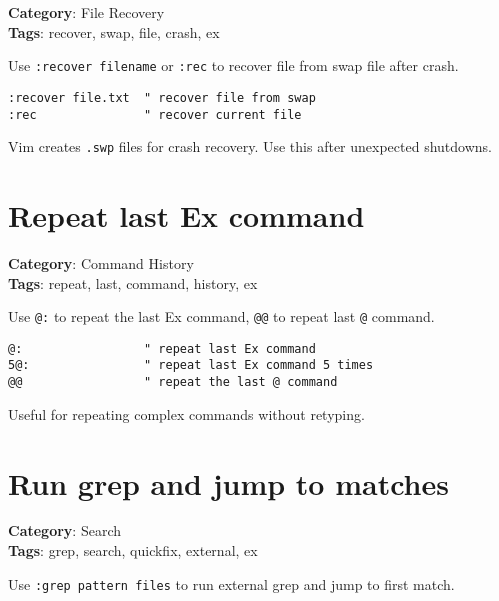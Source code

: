{{{{{{\textbf{Category}: File Recovery\\ \textbf{Tags}: recover, swap, file, crash, ex
\vspace{0.5cm}

Use {\footnotesize \Verb§:recover filename§} or {\footnotesize \Verb§:rec§} to recover file from swap file after crash.

\begin{Exa*}{}
\begin{Verbatim}[fontsize=\footnotesize, breaklines, breakanywhere]
:recover file.txt  " recover file from swap
:rec               " recover current file
\end{Verbatim}
\end{Exa*}

Vim creates {\footnotesize \Verb§.swp§} files for crash recovery. Use this after unexpected shutdowns.

\section{Repeat last Ex command}

\textbf{Category}: Command History\\ \textbf{Tags}: repeat, last, command, history, ex
\vspace{0.5cm}

Use {\footnotesize \Verb§@:§} to repeat the last Ex command, {\footnotesize \Verb§@@§} to repeat last {\footnotesize \Verb§@§} command.

\begin{Exa*}{}
\begin{Verbatim}[fontsize=\footnotesize, breaklines, breakanywhere]
@:                 " repeat last Ex command
5@:                " repeat last Ex command 5 times
@@                 " repeat the last @ command
\end{Verbatim}
\end{Exa*}

Useful for repeating complex commands without retyping.

\section{Run grep and jump to matches}

\textbf{Category}: Search\\ \textbf{Tags}: grep, search, quickfix, external, ex
\vspace{0.5cm}

Use {\footnotesize \Verb§:grep pattern files§} to run external grep and jump to first match.

}}}}}}
